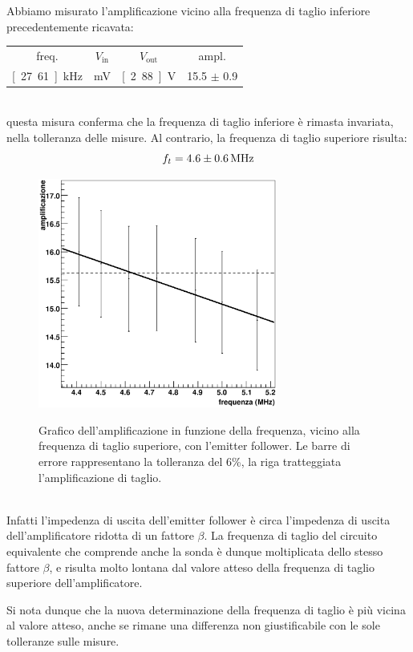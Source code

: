 \documentclass[italian,a4paper]{article}
\begin{document}
 Abbiamo misurato l'amplificazione vicino alla frequenza di taglio inferiore
 precedentemente ricavata:
 \begin{table}[h]
     \centering
 \begin{tabular}{*4c}                                   
     freq. & $V_\text{in}$ & $V_\text{out}$ & ampl. \\
     \unit[27.61]{kHz} & \unit[186]{mV} & \unit[2.88]{V} & 15.5 $\pm$ 0.9 \\
 \end{tabular}
 \end{table}\\
 questa misura conferma che la frequenza di taglio inferiore è rimasta
 invariata, nella tolleranza delle misure.
 Al contrario, la frequenza di taglio superiore risulta:
 \begin{equation*}
     f_t = \unit[4.6 \pm 0.6]{MHz}
 \end{equation*}
\begin{figure}[h]\caption{Grafico dell'amplificazione in funzione della
    frequenza, vicino alla frequenza di taglio superiore, con l'emitter
    follower. Le barre di errore rappresentano la
    tolleranza del 6\%, la riga tratteggiata l'amplificazione di taglio.}
        \centering                                     
        \includegraphics[width=0.7\textwidth]{emitter.eps}
    \label{fig:emitter}
\end{figure}\\
 Infatti l'impedenza di uscita dell'emitter follower è circa
 l'impedenza di uscita dell'amplificatore ridotta di un fattore $\beta$. La
 frequenza di taglio del circuito equivalente che comprende anche la sonda è
 dunque moltiplicata dello stesso fattore $\beta$, e risulta molto lontana
 dal valore atteso della frequenza di taglio superiore dell'amplificatore. 

 Si nota dunque che la nuova determinazione della frequenza di taglio è
 più vicina al valore atteso, anche se rimane una differenza non
 giustificabile con le sole tolleranze sulle misure.
\end{document}
